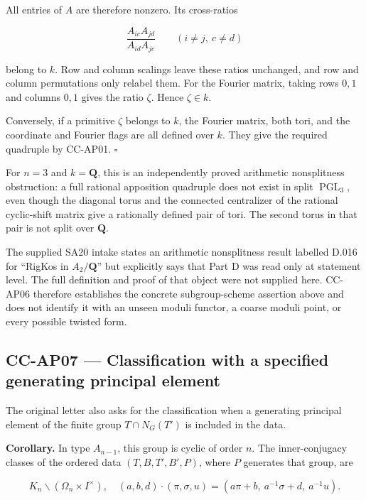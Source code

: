 \documentclass[11pt,a4paper]{article}
\theoremstyle{definition}\newtheorem{definition}[theorem]{Definition}
\theoremstyle{remark}\newtheorem{remark}[theorem]{Remark}
\begin{document}
All entries of \(A\) are therefore nonzero. Its cross-ratios

\[
 \frac{A_{ic}A_{jd}}{A_{id}A_{jc}}\qquad(i\ne j,\ c\ne d)
 \tag{CC-AP.12}
\]

belong to \(k\). Row and column scalings leave these ratios unchanged,
and row and column permutations only relabel them. For the Fourier
matrix, taking rows \(0,1\) and columns \(0,1\) gives the ratio
\(\zeta\). Hence \(\zeta\in k\).

Conversely, if a primitive \(\zeta\) belongs to \(k\), the Fourier
matrix, both tori, and the coordinate and Fourier flags are all defined
over \(k\). They give the required quadruple by CC-AP01. \(\square\)

For \(n=3\) and \(k=\mathbf Q\), this is an independently proved
arithmetic nonsplitness obstruction: a full rational apposition
quadruple does not exist in split \(\operatorname{PGL}_3\), even though
the diagonal torus and the connected centralizer of the rational
cyclic-shift matrix give a rationally defined pair of tori. The second
torus in that pair is not split over \(\mathbf Q\).

The supplied SA20 intake states an arithmetic nonsplitness result
labelled D.016 for ``RigKos in \(A_2/\mathbf Q\)'' but explicitly says
that Part D was read only at statement level. The full definition and
proof of that object were not supplied here. CC-AP06 therefore
establishes the concrete subgroup-scheme assertion above and does not
identify it with an unseen moduli functor, a coarse moduli point, or
every possible twisted form.

\subsection{CC-AP07 --- Classification with a specified generating
principal
element}\label{cc-ap07-classification-with-a-specified-generating-principal-element}

The original letter also asks for the classification when a generating
principal element of the finite group \(T\cap N_G(T')\) is included in
the data.

\textbf{Corollary.} In type \(A_{n-1}\), this group is cyclic of order
\(n\). The inner-conjugacy classes of the ordered data
\((T,B,T',B',P)\), where \(P\) generates that group, are

\[
 K_n\backslash(\Omega_n\times I^\times),
 \quad
 (a,b,d)\cdot(\pi,\sigma,u)
 =(a\pi+b,\ a^{-1}\sigma+d,\ a^{-1}u).
 \tag{CC-AP.13}
\]
\end{document}
